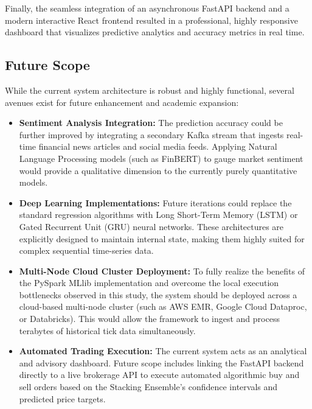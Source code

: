 \documentclass[12pt,a4paper]{report}
\begin{document}
Finally, the seamless integration of an asynchronous FastAPI backend and a modern interactive React frontend resulted in a professional, highly responsive dashboard that visualizes predictive analytics and accuracy metrics in real time.

\subsection{Future Scope}

While the current system architecture is robust and highly functional, several avenues exist for future enhancement and academic expansion:

\begin{itemize}
    \item \textbf{Sentiment Analysis Integration:} The prediction accuracy could be further improved by integrating a secondary Kafka stream that ingests real-time financial news articles and social media feeds. Applying Natural Language Processing models (such as FinBERT) to gauge market sentiment would provide a qualitative dimension to the currently purely quantitative models.
    \item \textbf{Deep Learning Implementations:} Future iterations could replace the standard regression algorithms with Long Short-Term Memory (LSTM) or Gated Recurrent Unit (GRU) neural networks. These architectures are explicitly designed to maintain internal state, making them highly suited for complex sequential time-series data.
    \item \textbf{Multi-Node Cloud Cluster Deployment:} To fully realize the benefits of the PySpark MLlib implementation and overcome the local execution bottlenecks observed in this study, the system should be deployed across a cloud-based multi-node cluster (such as AWS EMR, Google Cloud Dataproc, or Databricks). This would allow the framework to ingest and process terabytes of historical tick data simultaneously.
    \item \textbf{Automated Trading Execution:} The current system acts as an analytical and advisory dashboard. Future scope includes linking the FastAPI backend directly to a live brokerage API to execute automated algorithmic buy and sell orders based on the Stacking Ensemble's confidence intervals and predicted price targets.
\end{itemize}

\clearpage
\end{document}
